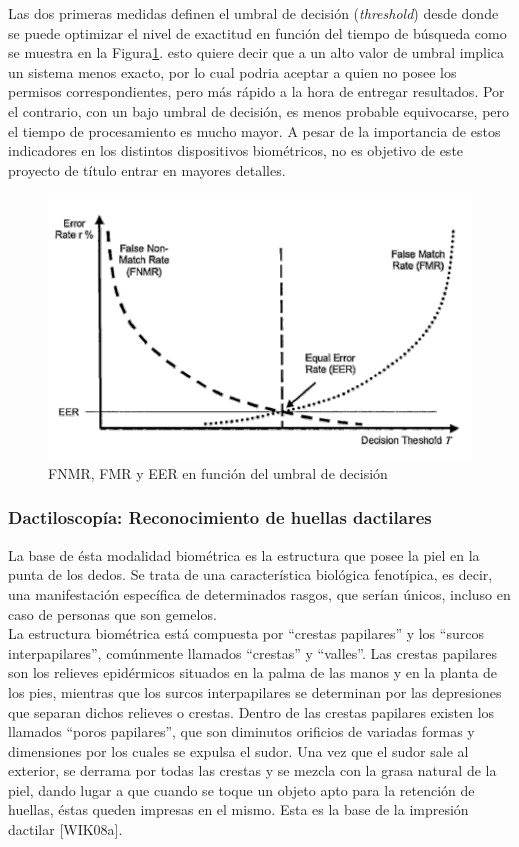 Las dos primeras medidas definen el umbral de decisión (\textit{threshold}) desde donde  se puede optimizar el nivel de exactitud en función del tiempo de búsqueda como  se muestra en la Figura\ref{umbral}. esto quiere decir que a un alto valor de umbral implica un sistema menos exacto, por lo  cual podria aceptar a quien no posee los permisos correspondientes, pero más rápido a la hora de entregar resultados. Por el contrario, con un bajo umbral de decisión, es menos probable equivocarse, pero el tiempo de procesamiento es mucho mayor. A pesar de la importancia de estos indicadores en los distintos dispositivos biométricos, no es objetivo de este proyecto de título entrar en mayores detalles.


\begin{figure}[H]
\centering
\includegraphics[scale=0.5]{images/capitulo2/umbral.png}
\caption{FNMR, FMR y EER en función del umbral de decisión}
\label{umbral}
\end{figure}

\subsubsection{Dactiloscopía: Reconocimiento de huellas dactilares}

La base de ésta modalidad biométrica es la estructura que posee la piel en la punta de los dedos. Se trata de una característica biológica fenotípica, es decir, una manifestación específica de determinados rasgos, que serían únicos, incluso en caso de personas que son gemelos.\\

La estructura biométrica está compuesta por ``crestas papilares'' y los ``surcos interpapilares'', comúnmente llamados ``crestas'' y ``valles''. Las crestas papilares son los relieves epidérmicos situados en la palma de las manos y en la planta de los pies, mientras que los surcos interpapilares se determinan por las depresiones que separan dichos relieves o crestas. Dentro de las crestas papilares existen los llamados ``poros papilares'', que son diminutos orificios de variadas formas y dimensiones por los cuales se expulsa el sudor. Una vez que el sudor sale al exterior, se derrama por todas las crestas y se mezcla con la grasa natural de la piel, dando lugar a que cuando se toque un objeto apto para la retención de huellas, éstas queden impresas en el mismo. Esta es la base de la impresión dactilar [WIK08a].

